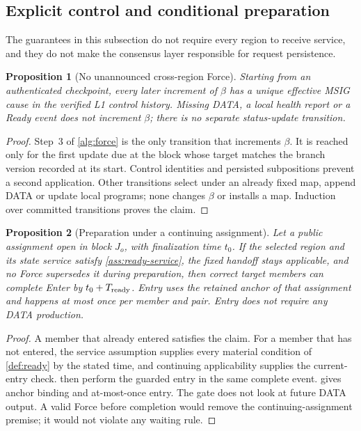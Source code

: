 \documentclass[11pt,a4paper]{article}
\newtheorem{proposition}[proposition]{Proposition}
\begin{document}
\subsection{Explicit control and conditional preparation}
\label{sec:liveness}
The guarantees in this subsection do not require every region to receive
service, and they do not make the consensus layer responsible for
request persistence.

\begin{proposition}[No unannounced cross-region Force]
\label{prop:explicit-force}
Starting from an authenticated checkpoint, every later increment of
$\beta$ has a unique effective MSIG cause in the verified L1 control
history. Missing DATA, a local health report or a Ready event does not
increment $\beta$; there is no separate status-update transition.
\end{proposition}
\begin{proof}
Step~3 of \cref{alg:force} is the only transition that increments
$\beta$. It is reached only for the first update due at the block whose
target matches the branch version recorded at its start. Control identities
and persisted subpositions prevent a second application. Other
transitions select under an already fixed map, append DATA or update
local programs; none changes $\beta$ or installs a map. Induction over committed
transitions proves the claim.
\end{proof}

\begin{proposition}[Preparation under a continuing assignment]
\label{prop:ready-bound}
Let a public assignment open in block $J_o$, with finalization time
$t_0$. If the selected region and its state service satisfy
\cref{ass:ready-service}, the fixed handoff stays applicable, and no
Force supersedes it during preparation, then correct target members can
complete Enter by $t_0+T_{\rm ready}$. Entry uses the retained
anchor of that assignment and happens at most once per member and pair.
Entry does not require any DATA production.
\end{proposition}
\begin{proof}
A member that already entered satisfies the claim. For a member that has
not entered, the service assumption supplies every material condition of
\cref{def:ready} by the stated time, and continuing applicability
supplies the current-entry check.  then
perform the guarded entry in the same complete event.
 gives anchor binding and at-most-once
entry. The gate does not look at future DATA output. A valid Force before
completion would remove the continuing-assignment premise; it would not
violate any waiting rule.
\end{proof}
\end{document}
